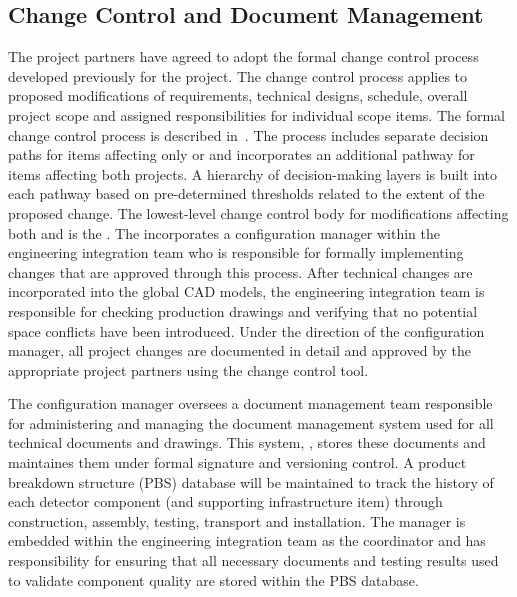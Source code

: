 \subsection{Change Control and Document Management}
\label{sec:dune_changecontrol}

The  project partners have agreed to adopt 
the formal change control process developed previously for the 
 project.  The change control process applies to 
proposed modifications of requirements, technical designs, 
schedule, overall project scope and assigned responsibilities 
for individual scope items.  The formal  
change control process is described in~.  The 
process includes separate decision paths for items affecting 
only  or  and incorporates an additional 
pathway for items affecting both projects.  A hierarchy of 
decision-making layers is built into each pathway based on 
pre-determined thresholds related to the extent of the proposed 
change.  The lowest-level change control body for modifications 
affecting both  and  is the .  
The  incorporates a configuration manager within the 
engineering integration team who is responsible for formally 
implementing changes that are approved through this process.  
After technical changes are incorporated into the global \threed 
CAD models, the engineering integration team is responsible for 
checking production drawings and verifying that no potential 
space conflicts have been introduced.  Under the direction of 
the configuration manager, all project changes are documented 
in detail and approved by the appropriate project partners using 
the  change control tool.

The configuration manager oversees a document management team
responsible for %
administering and managing the 
document management system used for all technical documents 
and drawings. This system, , stores these documents and maintaines them  
under formal signature and versioning control.  
A product breakdown
structure (PBS) database will be maintained to track the history of
each detector component (and supporting infrastructure item) through
construction, assembly, testing, transport and installation.  The
  manager is embedded within the
 engineering integration team as the  coordinator
and has responsibility for ensuring that all necessary documents and
testing results used to validate component quality are stored within
the PBS database.


